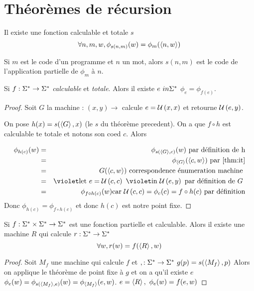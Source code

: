 \section{Théorèmes de récursion}


\begin{theorem}\label{thm:it}
	Il existe une fonction calculable et totale $s$ \tlq
	$$\forall n,m,w, \phi_{s(n,m)}(w) = \phi_m(\left\langle n,w\right\rangle)$$

	Si $m$ est le code d'un programme et $n$ un mot, alors $s(n,m)$ est le code de l'application partielle de $\phi_m$ à $n$.
\end{theorem}

\begin{theorem}
	Si $ f : \Sigma^{*} \to \Sigma^{*}$ \emph{calculable} et \emph {totale}. Alors il existe $e \ in \Sigma^{*}$ \tq $\phi_e = \phi_{f(e)}$.
\end{theorem}


\begin{proof}
	Soit $G$ la machine : $(x,y) \to $ calcule $e = \mathcal U \left(x,x\right)$ et retourne $\mathcal U \left(e,y\right)$.

	On pose $h(x) = s(\left\langle G\right\rangle, x)$ (le $s$ du théorème precedent). On a que $f \circ h$ est calculable te totale et notons son coed $c$. Alors

	\begin{eqnarray*}
		\phi_{h(c)} (w) &=& \phi_{s(\encode G, c)} (w) \text{ par définition de h} \\
		&=& \phi_{\encode G} (\encode {c, w}) \text{ par \ref{thm:it}} \\
		&=& G (\encode {c, w}) \text{ correspondence énumeration machine }\\
		&=& \letin e {\universal c c} \universal e y \text{ par définition de $G$ }\\
		&=& \phi_{f \circ h (c) } (w) \text{car } \universal c c = \phi_c(c) = f \circ h (c) \text{ par définition}
	\end{eqnarray*}
	Donc $\phi_{h(c)} = \phi_{f \circ h (c)}$ et donc $h(c)$ est notre point fixe.
\end{proof}


\begin{theorem}[de récursion]
	Si $f : \Sigma^{*} \times \Sigma^{*} \to \Sigma^{*}$ est une fonction partielle et calculable. Alors il existe une machine $R$ qui calcule $r : \Sigma^{*} \to \Sigma^{*} $ \tq
	$$ \forall w, r(w) =  f (\left\langle R\right\rangle, w)$$
\end{theorem}


\begin{proof}
	Soit $M_f$ une machine qui calcule $f$ et $, : \Sigma^{*} \to \Sigma^{*} \ g(p) = s(\left\langle M_f\right\rangle, p)$
	Alors on applique le théorème de point fixe à $g$ et on a qu'il existe $e$ \tq $\phi_e(w)
		=\phi_{s(\left\langle M_f\right\rangle,e)} (w) = \phi_{\left\langle M_f\right\rangle} (e,w)$.
	$e = \left\langle R\right\rangle, \ \phi_e (w) = f(e,w)$
\end{proof}


